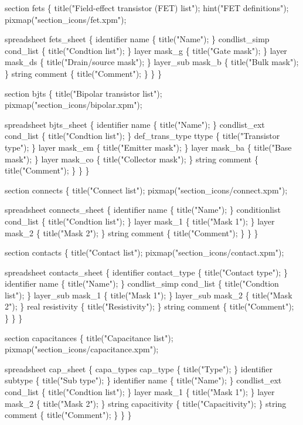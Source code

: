 section fets \{
    title("Field-effect transistor (FET) list");
    hint("FET definitions");
    pixmap("section_icons/fet.xpm");

    spreadsheet fets_sheet \{
        identifier      name \{ title("Name"); \}
        condlist_simp   cond_list \{ title("Condtion list"); \}
        layer           mask_g \{ title("Gate mask"); \}
        layer           mask_ds \{ title("Drain/source mask"); \}
        layer_sub       mask_b \{ title("Bulk mask"); \}
        string          comment \{ title("Comment"); \}
    \}
\}

section bjts \{
    title("Bipolar transistor list");
    pixmap("section_icons/bipolar.xpm");

    spreadsheet bjts_sheet \{
        identifier      name \{ title("Name"); \}
        condlist_ext    cond_list \{ title("Condtion list"); \}
        def_trans_type  ttype \{ title("Transistor type"); \}
        layer           mask_em \{ title("Emitter mask"); \}
        layer           mask_ba \{ title("Base mask"); \}
        layer           mask_co \{ title("Collector mask"); \}
        string          comment \{ title("Comment"); \}
    \}
\}

section connects \{
    title("Connect list");
    pixmap("section_icons/connect.xpm");

    spreadsheet connects_sheet \{
        identifier      name \{ title("Name"); \}
        conditionlist   cond_list \{ title("Condtion list"); \}
        layer           mask_1 \{ title("Mask 1"); \}
        layer           mask_2 \{ title("Mask 2"); \}
        string          comment \{ title("Comment"); \}
    \}
\}

section contacts \{
    title("Contact list");
    pixmap("section_icons/contact.xpm");

    spreadsheet contacts_sheet \{
        identifier      contact_type \{ title("Contact type"); \}
        identifier      name \{ title("Name"); \}
        condlist_simp   cond_list \{ title("Condtion list"); \}
        layer_sub       mask_1 \{ title("Mask 1"); \}
        layer_sub       mask_2 \{ title("Mask 2"); \}
        real            resistivity \{ title("Resistivity"); \}
        string          comment \{ title("Comment"); \}
    \}
\}

section capacitances \{
    title("Capacitance list");
    pixmap("section_icons/capacitance.xpm");

    spreadsheet cap_sheet \{
        capa_types      cap_type \{ title("Type"); \}
        identifier      subtype \{ title("Sub type"); \}
        identifier      name \{ title("Name"); \}
        condlist_ext    cond_list \{ title("Condtion list"); \}
        layer           mask_1 \{ title("Mask 1"); \}
        layer           mask_2 \{ title("Mask 2"); \}
        string          capacitivity \{ title("Capacitivity"); \}
        string          comment \{ title("Comment"); \}
    \}
\}

